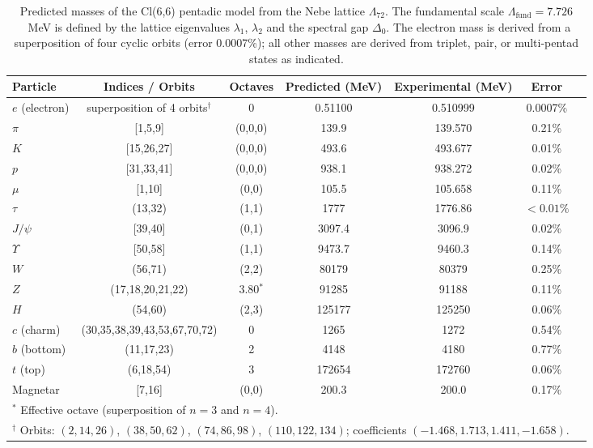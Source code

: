 \documentclass[11pt]{article}
\begin{document}
\begin{table}[htbp]
\centering
\small
\caption{Predicted masses of the Cl(6,6) pentadic model from the Nebe lattice $\Lambda_{72}$. The fundamental scale $\Lambda_{\text{fund}} = 7.726$~MeV is defined by the lattice eigenvalues $\lambda_1$, $\lambda_2$ and the spectral gap $\Delta_0$. The electron mass is derived from a superposition of four cyclic orbits (error 0.0007\%); all other masses are derived from triplet, pair, or multi-pentad states as indicated.}
\label{tab:masses_final}
\begin{tabular}{@{}lcccccc@{}}
\toprule
\textbf{Particle} & \textbf{Indices / Orbits} & \textbf{Octaves} & \textbf{Predicted (MeV)} & \textbf{Experimental (MeV)} & \textbf{Error} \\
\midrule
$e$ (electron) & superposition of 4 orbits$^\dagger$ & 0 & 0.51100 & 0.510999 & 0.0007\% \\
$\pi$ & [1,5,9] & (0,0,0) & 139.9 & 139.570 & 0.21\% \\
$K$ & [15,26,27] & (0,0,0) & 493.6 & 493.677 & 0.01\% \\
$p$ & [31,33,41] & (0,0,0) & 938.1 & 938.272 & 0.02\% \\
$\mu$ & [1,10] & (0,0) & 105.5 & 105.658 & 0.11\% \\
$\tau$ & (13,32) & (1,1) & 1777 & 1776.86 & $<0.01\%$ \\
$J/\psi$ & [39,40] & (0,1) & 3097.4 & 3096.9 & 0.02\% \\
$\Upsilon$ & [50,58] & (1,1) & 9473.7 & 9460.3 & 0.14\% \\
$W$ & (56,71) & (2,2) & 80179 & 80379 & 0.25\% \\
$Z$ & (17,18,20,21,22) & 3.80$^*$ & 91285 & 91188 & 0.11\% \\
$H$ & (54,60) & (2,3) & 125177 & 125250 & 0.06\% \\
$c$ (charm) & (30,35,38,39,43,53,67,70,72) & 0 & 1265 & 1272 & 0.54\% \\
$b$ (bottom) & (11,17,23) & 2 & 4148 & 4180 & 0.77\% \\
$t$ (top) & (6,18,54) & 3 & 172654 & 172760 & 0.06\% \\
Magnetar & [7,16] & (0,0) & 200.3 & 200.0 & 0.17\% \\
\bottomrule
\multicolumn{6}{l}{$^*$ Effective octave (superposition of $n=3$ and $n=4$).} \\
\multicolumn{6}{l}{$^\dagger$ Orbits: $(2,14,26)$, $(38,50,62)$, $(74,86,98)$, $(110,122,134)$; coefficients $(-1.468,1.713,1.411,-1.658)$.}
\end{tabular}
\end{table}
\end{document}
